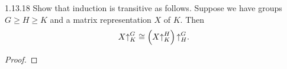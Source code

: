 \documentclass{../../math174}
\date{Wednesday, April 3}
\author{}
\begin{document}
\begin{problemlist}
\item[1.13.18] Show that induction is transitive as follows.  Suppose
  we have groups \(G \ge H \ge K\) and a matrix representation \(X\)
  of \(K\).  Then
  \[
    X{\uparrow}_K^G \cong \left( {X{\uparrow}_K^H} \right) {\uparrow}_H^G.
  \]

  \begin{solution}
    \begin{proof}

    \end{proof}
  \end{solution}
\end{problemlist}
\end{document}
